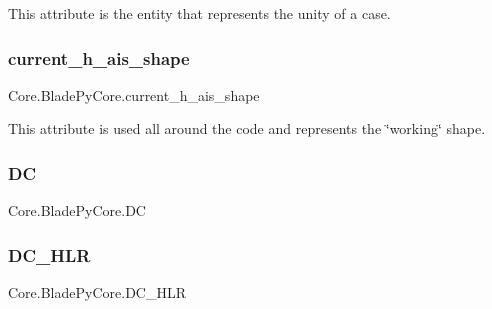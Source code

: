 This attribute is the entity that represents the unity of a case. 

\hypertarget{class_core_1_1_blade_py_core_a84a62c3017515ec840e35dbbe8ccbf21}{}\label{class_core_1_1_blade_py_core_a84a62c3017515ec840e35dbbe8ccbf21} 
\subsubsection{\texorpdfstring{current\+\_\+h\+\_\+ais\+\_\+shape}{current\_h\_ais\_shape}}
{\footnotesize\ttfamily Core.\+Blade\+Py\+Core.\+current\+\_\+h\+\_\+ais\+\_\+shape}



This attribute is used all around the code and represents the \char`\"{}working\char`\"{} shape. 

\hypertarget{class_core_1_1_blade_py_core_a8d53bb9fe024d3235652a6233d0d61a8}{}\label{class_core_1_1_blade_py_core_a8d53bb9fe024d3235652a6233d0d61a8} 
\subsubsection{\texorpdfstring{DC}{DC}}
{\footnotesize\ttfamily Core.\+Blade\+Py\+Core.\+DC}

\hypertarget{class_core_1_1_blade_py_core_a62af2479e8c1b0d3405a6122ea2be116}{}\label{class_core_1_1_blade_py_core_a62af2479e8c1b0d3405a6122ea2be116} 
\subsubsection{\texorpdfstring{D\+C\+\_\+\+H\+LR}{DC\_HLR}}
{\footnotesize\ttfamily Core.\+Blade\+Py\+Core.\+D\+C\+\_\+\+H\+LR}

\hypertarget{class_core_1_1_blade_py_core_a74bd4997b68dd3f273e5eb6cbbbac70a}{}\label{class_core_1_1_blade_py_core_a74bd4997b68dd3f273e5eb6cbbbac70a} 
